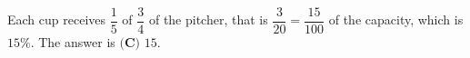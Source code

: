 Each cup receives $\dfrac15$ of $\dfrac34$ of the pitcher, that is $\dfrac{3}{20}=\dfrac{15}{100}$ of the capacity, which is $15\%$. The answer is $\boxed{\textbf{(C) }15}$.
